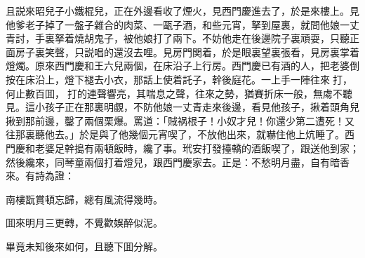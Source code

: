 且説來昭兒子小鐵棍兒，正在外邊看收了煙火，見西門慶進去了，於是來樓上。見他爹老子掉了一盤子雜合的肉菜、一甌子酒，和些元宵，拏到屋裏，就問他娘一丈青討，手裏拏着燒胡鬼子，被他娘打了兩下。不妨他走在後邊院子裏頑耍，只聽正面房子裏笑聲，只説唱的還沒去哩。見房門関着，於是眼裏望裏張看，見房裏掌着燈燭。原來西門慶和王六兒兩個，在床沿子上行房。西門慶已有酒的人，把老婆倒按在床沿上，燈下褪去小衣，那話上使着託子，幹後庭花。一上手一陣往來𢵞打，何止數百囬，𢵞打的連聲響亮，其喘息之聲，往來之勢，猶賽折床一般，無䖏不聽見。這小孩子正在那裏明覷，不防他娘一丈青走來後邊，看見他孩子，揪着頭角兒揪到那前邊，鑿了兩個栗爆。罵道：「賊祸根子！小奴才兒！你還少第二遭死！又往那裏聽他去。」於是與了他幾個元宵喫了，不放他出來，就嚇住他上炕睡了。西門慶和老婆足幹搗有兩頓飯時，纔了事。玳安打發擡轎的酒飯喫了，跟送他到家；然後纔來，同琴童兩個打着燈兒，跟西門慶家去。正是：不愁明月盡，自有暗香來。有詩為證：

\begin{myquote}
南樓翫賞頓忘歸，總有風流得幾時。

囬來明月三更轉，不覺歡娛醉似泥。
\end{myquote}

畢竟未知後來如何，且聽下囬分解。

